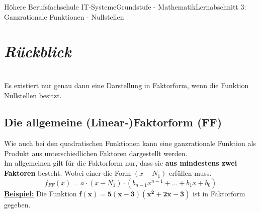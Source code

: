 \documentclass[11pt,twocolumn,oneside,openany,headings=optiontotoc,11pt,numbers=noenddot]{article}
\begin{document}
	\begin{worksheet}{Höhere Berufsfachschule IT-Systeme}{Grundstufe - Mathematik}{Lernabschnitt 3: Ganzrationale Funktionen - Nullstellen}
		\setcounter{section}{6}
		\setcounter{subsection}{3}
		\noindent
		\section*{\textit{Rückblick}}
		\begin{framed}
			\noindent
			\underline{\color{red}{Achtung!}}\\
			Es existiert nur genau dann eine Darstellung in Faktorform, wenn die Funktion Nullstellen besitzt.
		\end{framed}
		\subsection*{Die allgemeine (Linear-)Faktorform (FF)}
		Wie auch bei den quadratischen Funktionen kann eine ganzrationale Funktion als Produkt aus unterschiedlichen Faktoren dargestellt werden.\\
		Im allgemeinen gilt für die Faktorform nur, dass sie \textbf{aus mindestens zwei Faktoren} besteht. Wobei einer die Form \((x-N_1)\) erfüllen muss.
		\[f_{FF}(x) = a\cdot{}(x-N_1)\cdot{}(b_{n-1}x^{n-1}+\ldots{}+b_1x+ b_0)\]
		\textbf{\underline{Beispiel:}} Die Funktion \(\mathbf{f(x) = 5(x-3)(x^2+2x-3)}\) ist in Faktorform gegeben.

\end{worksheet}
\end{document}
